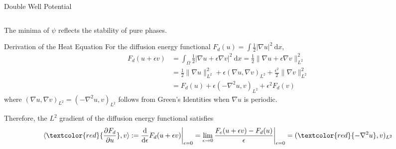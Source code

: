 \documentclass[professionalfont]{beamer}
\theoremstyle{remark}
\newcommand{\ud}{\mathrm{d}}
\begin{document}
\begin{frame}{Double Well Potential}
\begin{columns}
\begin{column}{.45\paperwidth}
		\end{column}
	\end{columns}

			

	\vspace{5 pt}
	The minima of $\psi$ reflects the stability of pure phases.

\end{frame}

\begin{frame}{Derivation of the Heat Equation}
	For the diffusion energy functional $F_d(u)=\int\frac{1}{2}|\nabla u|^2~\ud x$,
	\begin{align*}
		F_d(u+\epsilon v)&=\int_\Omega\frac{1}{2}|\nabla u+\epsilon \nabla v|^2~\ud x=\frac{1}{2}\|\nabla u+\epsilon\nabla v\|_{L^2}^2\\
		&=\frac{1}{2}\|\nabla u\|^2_{L^2}+\epsilon(\nabla u,\nabla v)_{L^2}+\frac{\epsilon^2}{2}\|\nabla v\|^2_{L^2}\\
		&=F_d(u)+ \epsilon(-\nabla^2u,v)_{L^2}+\epsilon^2F_d(v)
	\end{align*}
	where $(\nabla u,\nabla v)_{L^2}=(-\nabla^2 u,v)_{L^2}$ follows from Green's Identities when $\nabla u$ is periodic. 

	\vspace*{10 pt}

	Therefore, the $L^2$ gradient of the diffusion energy functional satisfies
	\begin{equation*}
		\langle\textcolor{red}{\frac{\partial F_d}{\partial u}},v\rangle:=\frac{\ud}{\ud \epsilon}F_d(u+\epsilon v)\bigg|_{\epsilon=0}=\lim_{\epsilon\to0}\frac{F_e(u+\epsilon v)-F_d(u)}{\epsilon}\bigg|_{\epsilon=0} =(\textcolor{red}{-\nabla^2u},v)_{L^2}
	\end{equation*}
	
\end{frame}
\end{document}

